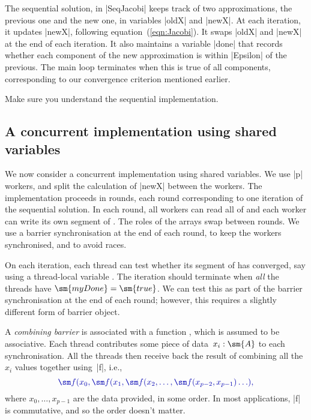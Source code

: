 The sequential solution, in |SeqJacobi| keeps track of two approximations, the
previous one and the new one, in variables |oldX| and |newX|.  At each
iteration, it updates |newX|, following equation~(\ref{eqn:Jacobi}).  It swaps
|oldX| and |newX| at the end of each iteration.  It also maintains a variable
|done| that records whether each component of the new approximation is within
|Epsilon| of the previous.  The main loop terminates when this is true of all
components, corresponding to our convergence criterion mentioned earlier. 

\begin{instruction}
Make sure you understand the sequential implementation.
\end{instruction}


\subsection{A concurrent implementation using shared variables}

We now consider a concurrent implementation using shared variables.  We 
use |p| workers, and split the calculation of |newX| between the workers.  The
implementation proceeds in rounds, each round corresponding to one iteration
of the sequential solution.  In each round, all workers can read all of
 and each worker can write its own segment of .  The
roles of the arrays swap between rounds.  We use a barrier synchronisation at
the end of each round, to keep the workers synchronised, and to avoid races.

On each iteration, each thread can test whether its segment of  has
converged, say using a thread-local variable .  The iteration
should terminate when \emph{all} the threads have $\sm{myDone} = \sm{true}$.
We can test this as part of the barrier synchronisation at the end of each
round; however, this requires a slightly different form of barrier object.  

A \emph{combining barrier} is associated with a function , which is assumed to be associative.  Each thread contributes some piece
of data~$x_i: \sm{A}$ to each synchronisation.  All the threads then receive
back the result of combining all the $x_i$ values together using~|f|, i.e.,
\[\mstyle
\sm f(x_0, \sm f(x_1, \sm f(x_2, \ldots, \sm f(x_{p-2}, x_{p-1})\ldots),
\]
where $x_0, \ldots, x_{p-1}$ are the data provided, in some order.  In most
applications, |f| is commutative, and so the order doesn't matter.

